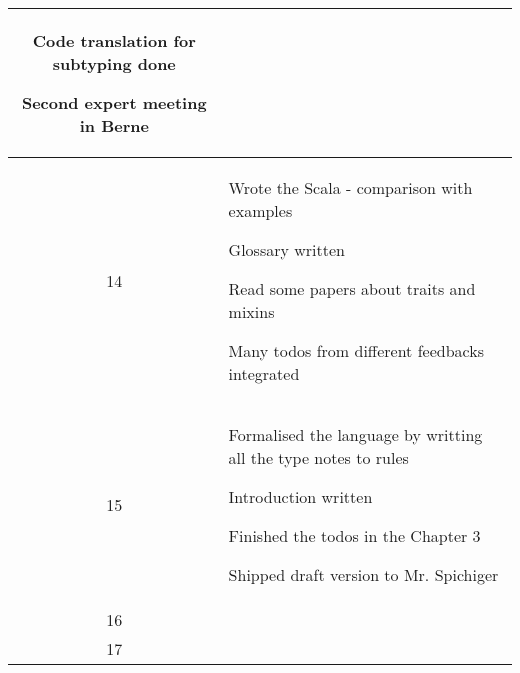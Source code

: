 \begin{center}
\begin{longtable}{|c|p{12cm}|}
\begin{journal}
	\item Code translation for subtyping done
	\item Second expert meeting in Berne
\end{journal}
\\ \hline
14 &
\begin{journal}
	\item Wrote the Scala - \ooplss comparison with examples
	\item Glossary written
	\item Read some papers about traits and mixins
	\item Many todos from different feedbacks integrated
\end{journal}
\\ \hline
15 &
\begin{journal}
	\item Formalised the language by writting all the type notes to rules
	\item Introduction written
	\item Finished the todos in the Chapter 3
	\item Shipped draft version to Mr. Spichiger
\end{journal}
\\ \hline
16 &
\begin{journal}
	\item
\end{journal}
\\ \hline
17 &
\begin{journal}
	\item
\end{journal}
\\ \hline
\end{longtable}
\end{center}
